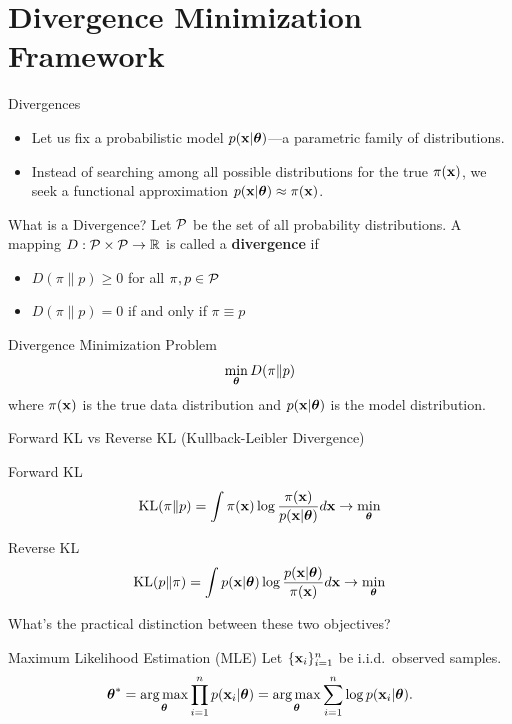 \documentclass{beamer}
\begin{document}
\section{Divergence Minimization Framework}
\begin{frame}{Divergences}
	\begin{itemize}
	\item Let us fix a probabilistic model $p(\mathbf{x} | \boldsymbol{\theta})$---a parametric family of distributions.\\
	\item Instead of searching among all possible distributions for the true $\pi(\mathbf{x})$, we seek a functional approximation $p(\mathbf{x} | \boldsymbol{\theta}) \approx \pi(\mathbf{x})$.
	\end{itemize}
	\begin{block}{What is a Divergence?}
		Let $\mathcal{P}$ be the set of all probability distributions. A mapping $D: \mathcal{P} \times \mathcal{P} \to \mathbb{R}$ is called a \textbf{divergence} if 
		\begin{itemize}
			\item $D(\pi \| p) \geq 0$ for all $\pi, p \in \mathcal{P}$
			\item $D(\pi \| p) = 0$ if and only if $\pi \equiv p$
		\end{itemize}
	\end{block}
	\begin{block}{Divergence Minimization Problem}
		\vspace{-0.3cm}
		$$
		\min_{\boldsymbol{\theta}} D(\pi \| p)
		$$
		where $\pi(\mathbf{x})$ is the true data distribution and $p(\mathbf{x} | \boldsymbol{\theta})$ is the model distribution.
	\end{block}
\end{frame}
\begin{frame}{Forward KL vs Reverse KL (Kullback-Leibler Divergence)}
	\begin{block}{Forward KL}
		\vspace{-0.2cm}
		$$
		\mathrm{KL}(\pi \| p) = \int \pi (\mathbf{x}) \log \frac{\pi(\mathbf{x})}{p(\mathbf{x} | \boldsymbol{\theta})} d \mathbf{x} \rightarrow \min_{\boldsymbol{\theta}}
		$$
	\end{block}
	\begin{block}{Reverse KL}
		\vspace{-0.2cm}
		$$
		\mathrm{KL}(p \| \pi) = \int p (\mathbf{x}| \boldsymbol{\theta}) \log \frac{p(\mathbf{x}| \boldsymbol{\theta})}{\pi(\mathbf{x})} d \mathbf{x} \rightarrow \min_{\boldsymbol{\theta}}
		$$
	\end{block}
	What's the practical distinction between these two objectives?
	
	\begin{block}{Maximum Likelihood Estimation (MLE)}
	Let $\{\mathbf{x}_i\}_{i=1}^n$ be i.i.d.\ observed samples.
		\vspace{-0.3cm}
		$$
		\boldsymbol{\theta}^* = \operatorname*{arg\,max}_{\boldsymbol{\theta}} \prod_{i=1}^n p(\mathbf{x}_i | \boldsymbol{\theta}) = \operatorname*{arg\,max}_{\boldsymbol{\theta}} \sum_{i=1}^n \log p(\mathbf{x}_i | \boldsymbol{\theta}).
		$$
	\end{block}
\end{frame}
\end{document}
